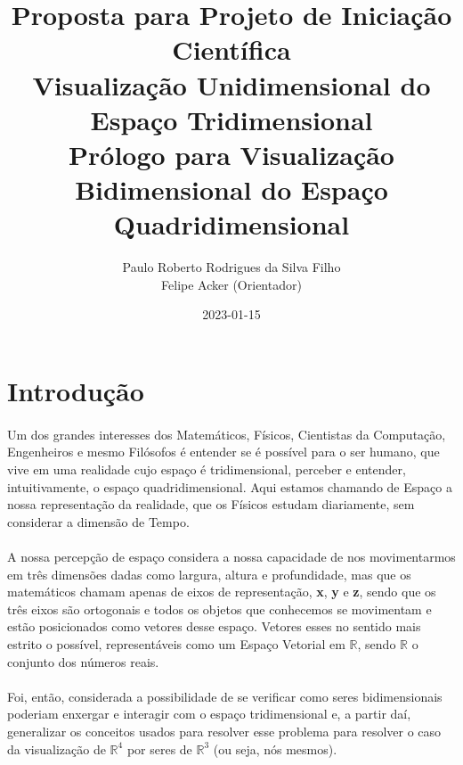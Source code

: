 \documentclass{article}
\title{
	Proposta para Projeto de Iniciação Científica \\
	Visualização Unidimensional do Espaço Tridimensional \\
	\large Prólogo para Visualização Bidimensional do Espaço Quadridimensional
}
\date{2023-01-15}
\author{Paulo Roberto Rodrigues da Silva Filho\\ \small Felipe Acker (Orientador)}
\newcommand\R{\mathbb{R}}
\begin{document}
	\renewcommand{\figurename}{Figura}
	\graphicspath{ {./imagens/} }
	\maketitle
	\tableofcontents
	\section{Introdução}
	\paragraph{} Um dos grandes interesses dos Matemáticos, Físicos, Cientistas da Computação, Engenheiros e mesmo Filósofos é entender se é possível para o ser humano, que vive em uma realidade cujo espaço é tridimensional, perceber e entender, intuitivamente, o espaço quadridimensional. Aqui estamos chamando de Espaço a nossa representação da realidade, que os Físicos estudam diariamente, sem considerar a dimensão de Tempo. 
	
	\paragraph{}
	A nossa percepção de espaço considera a nossa capacidade de nos movimentarmos em três dimensões dadas como largura, altura e profundidade, mas que os matemáticos chamam apenas de eixos de representação, \textbf{x}, \textbf{y} e \textbf{z}, sendo que os três eixos são ortogonais e todos os objetos que conhecemos se movimentam e estão posicionados como vetores desse espaço. Vetores esses no sentido mais estrito o possível, representáveis como um Espaço Vetorial em $\R$, sendo $\R$ o conjunto dos números reais.
	
	\paragraph{}
	Foi, então, considerada a possibilidade de se verificar como seres bidimensionais poderiam enxergar e interagir com o espaço tridimensional e, a partir daí, generalizar os conceitos usados para resolver esse problema para resolver o caso da visualização de $\R^4$ por seres de $\R^3$ (ou seja, nós mesmos).
	
\end{document}

